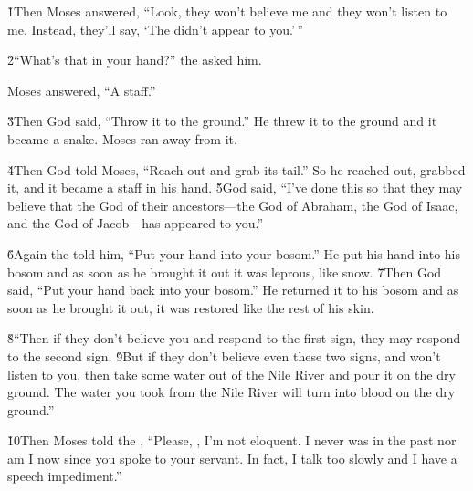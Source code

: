 \v{1}Then Moses answered, ``Look, they won't believe me and they won't listen to me. Instead, they'll say, `The  didn't appear to you.'\,''

\v{2}``What's that in your hand?'' the  asked him.

Moses answered, ``A staff.''

\v{3}Then God said, ``Throw it to the ground.'' He threw it to the ground and it became a snake. Moses ran away from it.

\v{4}Then God told Moses, ``Reach out and grab its tail.'' So he reached out, grabbed it, and it became a staff in his hand. \v{5}God said, ``I've done this so that they may believe that the  God of their ancestors---the God of Abraham, the God of Isaac, and the God of Jacob---has appeared to you.''

\v{6}Again the  told him, ``Put your hand into your bosom.'' He put his hand into his bosom and as soon as he brought it out it was leprous, like snow. \v{7}Then God said, ``Put your hand back into your bosom.'' He returned it to his bosom and as soon as he brought it out, it was restored like the rest of his skin.

\v{8}``Then if they don't believe you and respond to the first sign, they may respond to the second sign. \v{9}But if they don't believe even these two signs, and won't listen to you, then take some water out of the Nile River and pour it on the dry ground. The water you took from the Nile River will turn into blood on the dry ground.''

\v{10}Then Moses told the , ``Please, , I'm not eloquent. I never was in the past nor am I now since you spoke to your servant. In fact, I talk too slowly and I have a speech impediment.''

